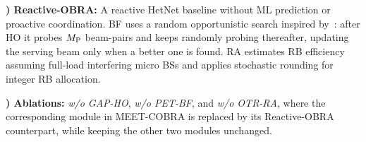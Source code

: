 \documentclass[conference, a4paper]{IEEEtran}
\newcommand{\currentrev}[1]{\textcolor{red}{{}#1}}
\newif\ifshowdeletions
\newcommand{\currentdel}[1]{\ifshowdeletions\textcolor{deletioncolor}{\sout{#1}}\fi}
\theoremstyle{remark}
\begin{document}
\textbf{\currentdel{3}) Reactive-OBRA:} A reactive HetNet baseline without ML prediction or proactive coordination. \currentdel{HO is received signal strength (RSS)-based. When the serving BS is overloaded, users are offloaded to the nearest available BS~\mbox{\cite{Alexandris2016LoadAwareHO}}.} BF uses a random opportunistic search inspired by~\cite{Aykin2020}: after HO it probes $M_{\rm P}$ beam-pairs and keeps randomly probing thereafter, updating the serving beam only when a better one is found. RA estimates RB efficiency assuming full-load interfering micro BSs and applies stochastic rounding for integer RB allocation.


\textbf{\currentdel{4}) Ablations:} \emph{w/o GAP-HO}, \emph{w/o PET-BF}, and \emph{w/o OTR-RA}, where the corresponding module in MEET-COBRA is replaced by its Reactive-OBRA counterpart, while keeping the other two modules unchanged.
\end{document}
